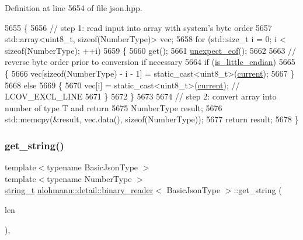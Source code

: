 Definition at line 5654 of file json.\+hpp.


\begin{DoxyCode}
5655     \{
5656         \textcolor{comment}{// step 1: read input into array with system's byte order}
5657         std::array<uint8\_t, sizeof(NumberType)> vec;
5658         \textcolor{keywordflow}{for} (std::size\_t i = 0; i < \textcolor{keyword}{sizeof}(NumberType); ++i)
5659         \{
5660             \textcolor{keyword}{get}();
5661             \hyperlink{classnlohmann_1_1detail_1_1binary__reader_a1dfc55484af3a896c376b41cd99f3e15}{unexpect\_eof}();
5662 
5663             \textcolor{comment}{// reverse byte order prior to conversion if necessary}
5664             \textcolor{keywordflow}{if} (\hyperlink{classnlohmann_1_1detail_1_1binary__reader_a54c18bdb48cccf35a8f941640e0fcea4}{is\_little\_endian})
5665             \{
5666                 vec[\textcolor{keyword}{sizeof}(NumberType) - i - 1] = static\_cast<uint8\_t>(\hyperlink{classnlohmann_1_1detail_1_1binary__reader_a7e994e201b215cd6d6ae28a1853f43e0}{current});
5667             \}
5668             \textcolor{keywordflow}{else}
5669             \{
5670                 vec[i] = \textcolor{keyword}{static\_cast<}uint8\_t\textcolor{keyword}{>}(\hyperlink{classnlohmann_1_1detail_1_1binary__reader_a7e994e201b215cd6d6ae28a1853f43e0}{current}); \textcolor{comment}{// LCOV\_EXCL\_LINE}
5671             \}
5672         \}
5673 
5674         \textcolor{comment}{// step 2: convert array into number of type T and return}
5675         NumberType result;
5676         std::memcpy(&result, vec.data(), \textcolor{keyword}{sizeof}(NumberType));
5677         \textcolor{keywordflow}{return} result;
5678     \}
\end{DoxyCode}
\mbox{\label{classnlohmann_1_1detail_1_1binary__reader_a195b573a807da6d5841a898c6f74e03c}} 
\subsubsection{\texorpdfstring{get\+\_\+string()}{get\_string()}}
{\footnotesize\ttfamily template$<$typename Basic\+Json\+Type $>$ \\
template$<$typename Number\+Type $>$ \\
\hyperlink{classnlohmann_1_1detail_1_1binary__reader_a889a8702ca8aa45e99136bc31ea898e9}{string\+\_\+t} \hyperlink{classnlohmann_1_1detail_1_1binary__reader}{nlohmann\+::detail\+::binary\+\_\+reader}$<$ Basic\+Json\+Type $>$\+::get\+\_\+string (\begin{DoxyParamCaption}\item[{const Number\+Type}]{len }\end{DoxyParamCaption})\hspace{0.3cm}{\ttfamily [inline]}, {\ttfamily [private]}}



